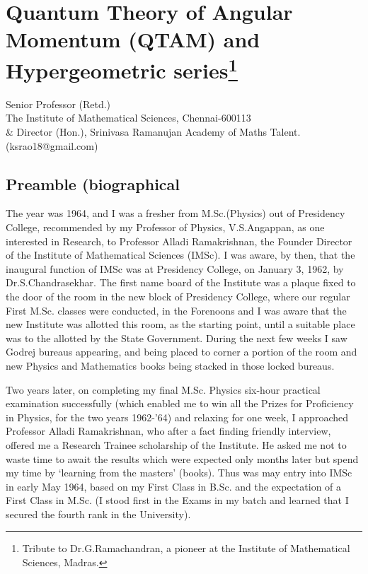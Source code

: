 \renewcommand{\thefootnote}{\arabic{footnote}}

\chapter[Quantum Theory of Angular Momentum (QTAM) and Hypergeometric series]{Quantum Theory of Angular Momentum (QTAM) and Hypergeometric series\footnote{Tribute to Dr.G.Ramachandran, a pioneer at the Institute of Mathematical Sciences, Madras.}}\label{chap29}


\begin{center}
Senior Professor (Retd.)\\ 
The Institute of Mathematical Sciences, Chennai-600113\\
\& Director (Hon.), Srinivasa Ramanujan Academy of Maths Talent.\\
(ksrao18@gmail.com)
\end{center}


\section*{Preamble (biographical}

The year was 1964, and I was a fresher from M.Sc.(Physics) out of Presidency College, recommended by my Professor of Physics, V.S.Angappan, as one interested in Research, to Professor Alladi Ramakrishnan, the Founder Director of the Institute of Mathematical Sciences (IMSc). I was aware, by then, that the inaugural function of IMSc was at Presidency College, on January 3, 1962, by Dr.S.Chandrasekhar. The first name board of the Institute was a plaque fixed to the door of the room in the new block of Presidency College, where our regular First M.Sc. classes were conducted, in the Forenoons and I was aware that the new Institute was allotted this room, as the starting point, until a suitable place was to the allotted by the State Government. During the next few weeks I saw Godrej bureaus appearing, and being placed to corner a portion of the room and new Physics and Mathematics books being stacked in those locked bureaus.

Two years later, on completing my final M.Sc. Physics six-hour practical examination successfully (which enabled me to win all the Prizes for Proficiency in Physics, for the two years 1962-'64) and relaxing for one week, I approached Professor Alladi Ramakrishnan, who after a fact finding friendly interview, offered me a Research Trainee scholarship of the Institute. He asked me not to waste time to await the results which were expected only months later but spend my time by `learning from the masters' (books). Thus was may entry into IMSc in early May 1964, based on my First Class in B.Sc. and the expectation of a First Class in M.Sc. (I stood first in the Exams in my batch and learned that I secured the fourth rank in the University).

